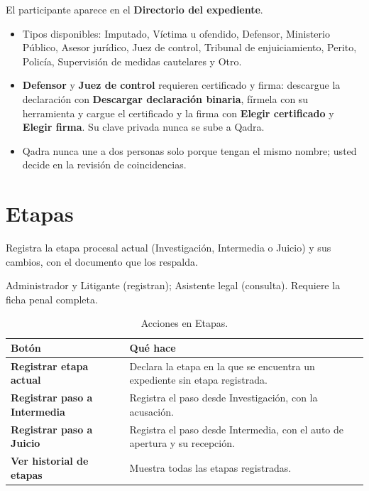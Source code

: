 \resultado El participante aparece en el \textbf{Directorio del expediente}.

\begin{itemize}
  \item Tipos disponibles: Imputado, Víctima u ofendido, Defensor,
        Ministerio Público, Asesor jurídico, Juez de control, Tribunal de
        enjuiciamiento, Perito, Policía, Supervisión de medidas cautelares y
        Otro.
  \item \textbf{Defensor} y \textbf{Juez de control} requieren certificado y
        firma: descargue la declaración con
        \textbf{Descargar declaración binaria}, fírmela con su herramienta y
        cargue el certificado y la firma con \textbf{Elegir certificado} y
        \textbf{Elegir firma}. Su clave privada nunca se sube a Qadra.
  \item Qadra nunca une a dos personas solo porque tengan el mismo nombre;
        usted decide en la revisión de coincidencias.
\end{itemize}

\section{Etapas}\label{sec:etapas}

\paraque Registra la etapa procesal actual (Investigación, Intermedia o
Juicio) y sus cambios, con el documento que los respalda.

\disponible Administrador y Litigante (registran); Asistente legal
(consulta). Requiere la ficha penal completa.

\begin{table}[H]
  \centering
  \caption{Acciones en Etapas.}\label{tab:acciones-etapas}
  \begin{tabularx}{\textwidth}{L{4.6cm} Y}
    \toprule
    \textbf{Botón} & \textbf{Qué hace} \\
    \midrule
    \textbf{Registrar etapa actual}       & Declara la etapa en la que se encuentra un expediente sin etapa registrada. \\
    \textbf{Registrar paso a Intermedia}  & Registra el paso desde Investigación, con la acusación. \\
    \textbf{Registrar paso a Juicio}      & Registra el paso desde Intermedia, con el auto de apertura y su recepción. \\
    \textbf{Ver historial de etapas}      & Muestra todas las etapas registradas. \\
    \bottomrule
  \end{tabularx}
\end{table}

